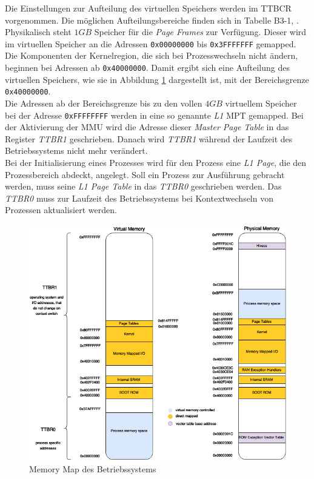 Die Einstellungen zur Aufteilung des virtuellen Speichers werden im \ac{TTBCR} vorgenommen. Die möglichen Aufteilungsbereiche finden sich in Tabelle B3-1, \cite[S. B3-1330]{ARM:ARM}.\\

Physikalisch steht $1GB$ Speicher für die \textit{Page Frames} zur Verfügung. Dieser wird im virtuellen Speicher an die Adressen \texttt{0x00000000} bis \texttt{0x3FFFFFFF} gemapped. Die Komponenten der Kernelregion, die sich bei Prozesswechseln nicht ändern, beginnen bei Adressen ab \texttt{0x40000000}. Damit ergibt sich eine Aufteilung des virtuellen Speichers, wie sie in Abbildung \ref{fig:MemoryMap} dargestellt ist, mit der Bereichsgrenze \texttt{0x40000000}.\\

Die Adressen ab der Bereichsgrenze bis zu den vollen $4GB$ virtuellem Speicher bei der Adresse \texttt{0xFFFFFFFF} werden in eine so genannte \textit{L1} \ac{MPT} gemapped. Bei der Aktivierung der \ac{MMU} wird die Adresse dieser \textit{Master Page Table} in das Register \textit{TTBR1} geschrieben. Danach wird \textit{TTBR1} während der Laufzeit des Betriebssystems nicht mehr verändert.\\

Bei der Initialisierung eines Prozesses wird für den Prozess eine \textit{L1 Page}, die den Prozessbereich abdeckt, angelegt. Soll ein Prozess zur Ausführung gebracht werden, muss seine \textit{L1 Page Table} in das \textit{TTBR0} geschrieben werden. Das \textit{TTBR0} muss zur Laufzeit des Betriebssystems bei Kontextwechseln von Prozessen aktualisiert werden.\\


\begin{figure}[H]
	\includegraphics[scale=0.60]{chapters/mmu/figures/MemoryMap}
	\caption{Memory Map des Betriebssystems}
	\label{fig:MemoryMap}
\end{figure}

